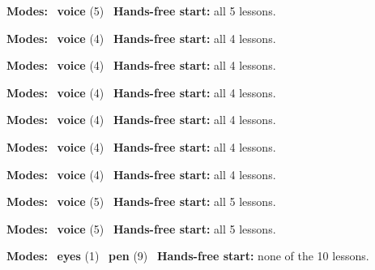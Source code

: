 \expandafter\def\csname hlchaptermodality6\endcsname{%
  {\small\noindent
    \textbf{Modes:} \hlvoicesign{}~\textbf{voice} (5)\quad
    \hlvoicesign{}~\textbf{Hands-free start:} all 5 lessons.%
    \par}\medskip
}

\expandafter\def\csname hlchaptermodality7\endcsname{%
  {\small\noindent
    \textbf{Modes:} \hlvoicesign{}~\textbf{voice} (4)\quad
    \hlvoicesign{}~\textbf{Hands-free start:} all 4 lessons.%
    \par}\medskip
}

\expandafter\def\csname hlchaptermodality8\endcsname{%
  {\small\noindent
    \textbf{Modes:} \hlvoicesign{}~\textbf{voice} (4)\quad
    \hlvoicesign{}~\textbf{Hands-free start:} all 4 lessons.%
    \par}\medskip
}

\expandafter\def\csname hlchaptermodality9\endcsname{%
  {\small\noindent
    \textbf{Modes:} \hlvoicesign{}~\textbf{voice} (4)\quad
    \hlvoicesign{}~\textbf{Hands-free start:} all 4 lessons.%
    \par}\medskip
}

\expandafter\def\csname hlchaptermodality10\endcsname{%
  {\small\noindent
    \textbf{Modes:} \hlvoicesign{}~\textbf{voice} (4)\quad
    \hlvoicesign{}~\textbf{Hands-free start:} all 4 lessons.%
    \par}\medskip
}

\expandafter\def\csname hlchaptermodality11\endcsname{%
  {\small\noindent
    \textbf{Modes:} \hlvoicesign{}~\textbf{voice} (4)\quad
    \hlvoicesign{}~\textbf{Hands-free start:} all 4 lessons.%
    \par}\medskip
}

\expandafter\def\csname hlchaptermodality12\endcsname{%
  {\small\noindent
    \textbf{Modes:} \hlvoicesign{}~\textbf{voice} (4)\quad
    \hlvoicesign{}~\textbf{Hands-free start:} all 4 lessons.%
    \par}\medskip
}

\expandafter\def\csname hlchaptermodality13\endcsname{%
  {\small\noindent
    \textbf{Modes:} \hlvoicesign{}~\textbf{voice} (5)\quad
    \hlvoicesign{}~\textbf{Hands-free start:} all 5 lessons.%
    \par}\medskip
}

\expandafter\def\csname hlchaptermodality14\endcsname{%
  {\small\noindent
    \textbf{Modes:} \hlvoicesign{}~\textbf{voice} (5)\quad
    \hlvoicesign{}~\textbf{Hands-free start:} all 5 lessons.%
    \par}\medskip
}

\expandafter\def\csname hlchaptermodality15\endcsname{%
  {\small\noindent
    \textbf{Modes:} \hlsightsign{}~\textbf{eyes} (1) \quad \hlpensign{}~\textbf{pen} (9)\quad
    \hlvoicesign{}~\textbf{Hands-free start:} none of the 10 lessons.%
    \par}\medskip
}
